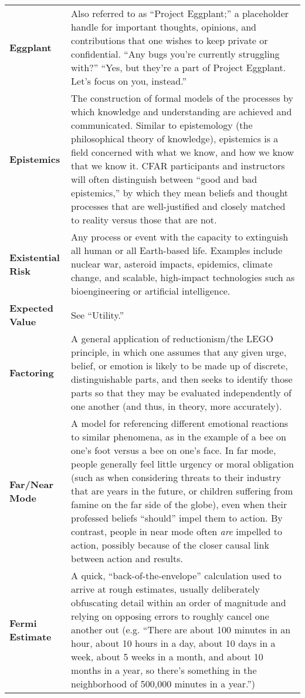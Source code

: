 \begin{longtable} { p{} p{} }
\textbf{Eggplant} & Also referred to as ``Project Eggplant;'' a placeholder handle for important thoughts, opinions, and contributions that one wishes to keep private or confidential.  ``Any bugs you're currently struggling with?''  ``Yes, but they're a part of Project Eggplant.  Let's focus on you, instead.''\\

\textbf{Epistemics} & The construction of formal models of the processes by which knowledge and understanding are achieved and communicated.  Similar to epistemology (the philosophical theory of knowledge), epistemics is a field concerned with what we know, and how we know that we know it.  CFAR participants and instructors will often distinguish between ``good and bad epistemics,'' by which they mean beliefs and thought processes that are well-justified and closely matched to reality versus those that are not.\\

\textbf{Existential Risk} & Any process or event with the capacity to extinguish all human or all Earth-based life.  Examples include nuclear war, asteroid impacts, epidemics, climate change, and scalable, high-impact technologies such as bioengineering or artificial intelligence.\\

\textbf{Expected Value} & See ``Utility.''\\

\textbf{Factoring} & A general application of reductionism/the LEGO principle, in which one assumes that any given urge, belief, or emotion is likely to be made up of discrete, distinguishable parts, and then seeks to identify those parts so that they may be evaluated independently of one another (and thus, in theory, more accurately).\\

\textbf{Far/Near Mode} & A model for referencing different emotional reactions to similar phenomena, as in the example of a bee on one's foot versus a bee on one's face.  In far mode, people generally feel little urgency or moral obligation (such as when considering threats to their industry that are years in the future, or children suffering from famine on the far side of the globe), even when their professed beliefs ``should'' impel them to action.  By contrast, people in near mode often \emph{are} impelled to action, possibly because of the closer causal link between action and results. \\

\textbf{Fermi Estimate} & A quick, ``back-of-the-envelope'' calculation used to arrive at rough estimates, usually deliberately obfuscating detail within an order of magnitude and relying on opposing errors to roughly cancel one another out (e.g. ``There are about 100 minutes in an hour, about 10 hours in a day, about 10 days in a week, about 5 weeks in a month, and about 10 months in a year, so there's something in the neighborhood of 500,000 minutes in a year.'')\\


\end{longtable}
